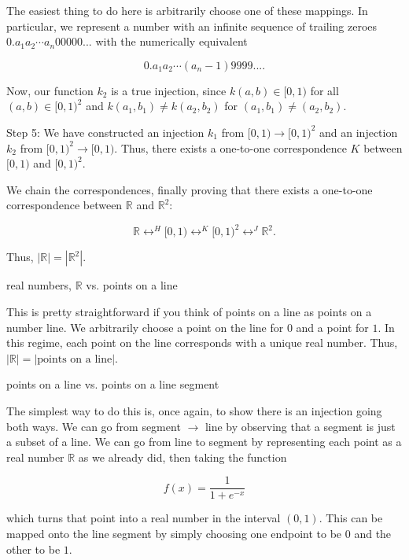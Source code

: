\documentclass[../key.tex]{subfiles}
\begin{document}
\noindent The easiest thing to do here is arbitrarily choose one of these mappings. In particular, we represent a number with an infinite sequence of trailing zeroes $0.a_1a_2\cdots a_n00000...$ with the numerically equivalent

$$0.a_1a_2\cdots (a_n-1)9999....$$

\noindent Now, our function $k_2$ is a true injection, since $k(a,b)\in [0,1)$ for all $(a,b)\in [0,1)^2$ and $k(a_1,b_1)\neq k(a_2,b_2)$ for $(a_1,b_1)\neq (a_2,b_2)$.

Step 5: We have constructed an injection $k_1$ from $[0,1)\to [0,1)^2$ and an injection $k_2$ from $[0,1)^2\to [0,1)$. Thus, there exists a one-to-one correspondence $K$ between $[0,1)$ and $[0,1)^2$.

We chain the correspondences, finally proving that there exists a one-to-one correspondence between $\mathbb{R}$ and $\mathbb{R}^2$:

$$\mathbb{R} \mathop{\leftrightarrow} ^{H} [0,1) \mathop{\leftrightarrow} ^ {K} [0,1)^2 \mathop{\leftrightarrow} ^ {J} \mathbb{R}^2.$$

\noindent Thus, $|\mathbb{R}|=\left|\mathbb{R}^2\right|$.

\begin{inner_problem}
\item real numbers, $\mathbb{R}$ vs. points on a line
\end{inner_problem}

\noindent This is pretty straightforward if you think of points on a line as points on a number line. We arbitrarily choose a point on the line for $0$ and a point for $1$. In this regime, each point on the line corresponds with a unique real number. Thus, $|\mathbb{R}| = |\text{points on a line}|$.

\begin{inner_problem}
\item points on a line vs. points on a line segment
\end{inner_problem}

\noindent The simplest way to do this is, once again, to show there is an injection going both ways. We can go from segment $\to$ line by observing that a segment is just a subset of a line. We can go from line to segment by representing each point as a real number $\mathbb{R}$ as we already did, then taking the function

$$f(x)=\frac{1}{1+e^{-x}}$$

\noindent which turns that point into a real number in the interval $(0,1)$. This can be mapped onto the line segment by simply choosing one endpoint to be $0$ and the other to be $1$.
\end{document}
